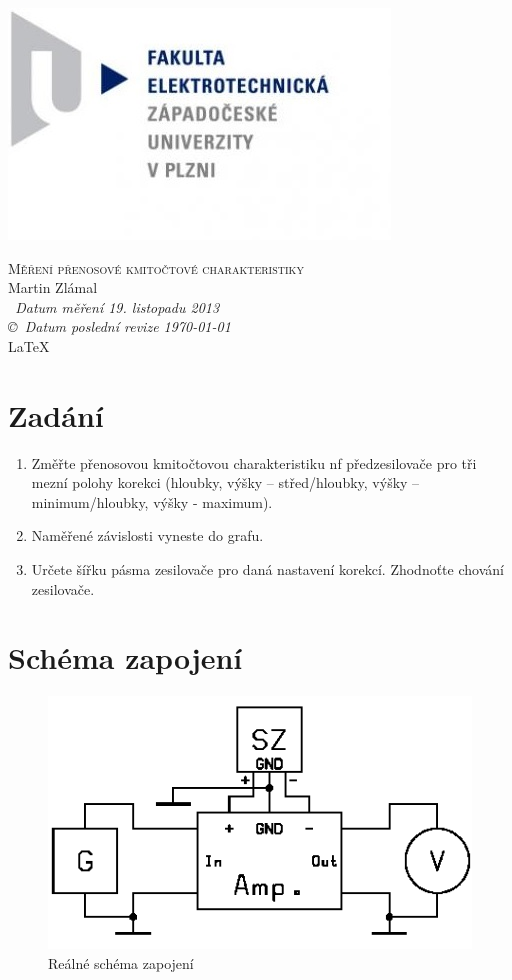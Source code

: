 \documentclass[12pt]{article} %
\begin{document}
\begin{titlepage}
	\includegraphics[scale=0.7]{logo.jpg}
	\vspace*{\fill}
	\begin{center}
		\textsc{\LARGE Měření přenosové kmitočtové charakteristiky}\\[1cm]
		Martin Zlámal \\[1cm]
		{\small\em \ Datum měření 19. listopadu 2013 } \\
		{\small\em \copyright \ Datum poslední revize \today } \\
		\LaTeX
	\end{center}
	\vspace*{\fill}
\end{titlepage}
\newpage

\section{Zadání}
\begin{enumerate}
\item Změřte přenosovou kmitočtovou charakteristiku nf předzesilovače pro tři mezní
polohy korekci (hloubky, výšky – střed/hloubky, výšky – minimum/hloubky,
výšky - maximum).
\item Naměřené závislosti vyneste do grafu.
\item Určete šířku pásma zesilovače pro daná nastavení korekcí. Zhodnoťte chování
zesilovače.
\end{enumerate}

\section{Schéma zapojení}
\begin{figure}[H]
\center
\includegraphics[scale=0.7]{schema.png}
\caption{Reálné schéma zapojení}
\end{figure}
\end{document}
